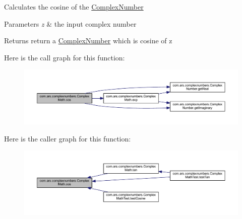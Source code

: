 Calculates the cosine of the {\ttfamily \hyperlink{classcom_1_1ars_1_1complexnumbers_1_1_complex_number}{Complex\+Number}} 
\begin{DoxyParams}{Parameters}
{\em z} & the input complex number \\
\hline
\end{DoxyParams}
\begin{DoxyReturn}{Returns}
return a {\ttfamily \hyperlink{classcom_1_1ars_1_1complexnumbers_1_1_complex_number}{Complex\+Number}} which is cosine of z 
\end{DoxyReturn}
Here is the call graph for this function\+:
\nopagebreak
\begin{figure}[H]
\begin{center}
\leavevmode
\includegraphics[width=350pt]{classcom_1_1ars_1_1complexnumbers_1_1_complex_math_a0ef9a0fc1769a14c5f81f89866643f19_cgraph}
\end{center}
\end{figure}
Here is the caller graph for this function\+:
\nopagebreak
\begin{figure}[H]
\begin{center}
\leavevmode
\includegraphics[width=350pt]{classcom_1_1ars_1_1complexnumbers_1_1_complex_math_a0ef9a0fc1769a14c5f81f89866643f19_icgraph}
\end{center}
\end{figure}
\hypertarget{classcom_1_1ars_1_1complexnumbers_1_1_complex_math_a390a771ed2ef544949621be5375c806a}{}\label{classcom_1_1ars_1_1complexnumbers_1_1_complex_math_a390a771ed2ef544949621be5375c806a} 
